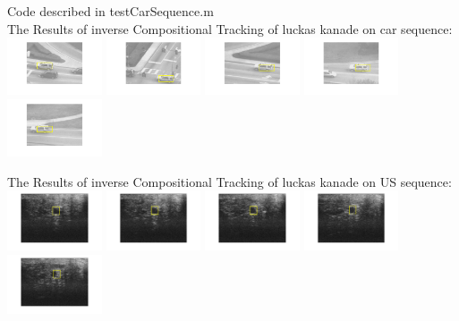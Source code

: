 \documentclass[12pt]{article}
\newenvironment{problem}[2][Problem]{\begin{trivlist}
\item[\hskip \labelsep {\bfseries #1}\hskip \labelsep {\bfseries #2.}]}{\end{trivlist}}
\begin{document}
\begin{problem}{1.3}
Code described in testCarSequence.m \\
The Results of inverse Compositional Tracking of luckas kanade on car sequence:\\
  \includegraphics[width=0.21\textwidth]{results/2_car}
  \includegraphics[width=0.21\textwidth]{results/100_car}
  \includegraphics[width=0.21\textwidth]{results/200_car}
  \includegraphics[width=0.21\textwidth]{results/300_car}  
  \includegraphics[width=0.21\textwidth]{results/400_car}  
  
The Results of inverse Compositional Tracking of luckas kanade on US sequence:\\

  \includegraphics[width=0.21\textwidth]{results/5_us}
  \includegraphics[width=0.21\textwidth]{results/25_us}
  \includegraphics[width=0.21\textwidth]{results/50_us}
  \includegraphics[width=0.21\textwidth]{results/75_us}  
  \includegraphics[width=0.21\textwidth]{results/100_us}  


\end{problem}
\end{document}
